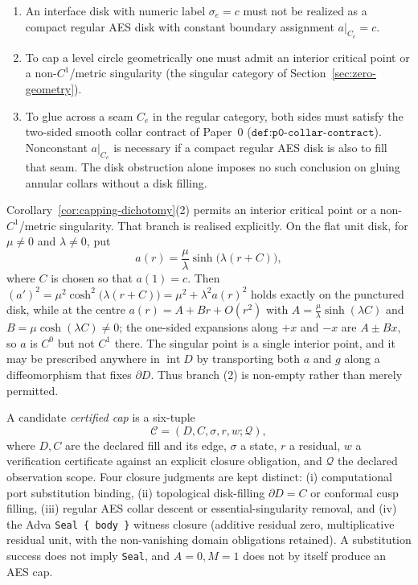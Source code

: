 \begin{corollary}
\label{cor:capping-dichotomy}
\begin{enumerate}
  \item An interface disk with numeric label $\sigma_e=c$ must not be realized
  as a compact regular AES disk with constant boundary assignment
  $a|_{C_e}=c$.
  \item To cap a level circle geometrically one must admit an interior critical
  point or a non-$C^1$/metric singularity (the singular category of
  Section~\ref{sec:zero-geometry}).
  \item To glue across a seam $C_e$ in the regular category, both sides must
  satisfy the two-sided smooth collar contract of Paper~0
  ($\texttt{def:p0-collar-contract}$).  Nonconstant $a|_{C_e}$ is necessary
  if a compact regular AES disk is also to fill that seam.  The disk
  obstruction alone imposes no such conclusion on gluing annular collars
  without a disk filling.
\end{enumerate}
\end{corollary}

\begin{remark}
\label{rem:capping-singular-branch-nonempty}
Corollary~\ref{cor:capping-dichotomy}(2) permits an interior critical point or a
non-$C^1$/metric singularity.  That branch is realised explicitly.  On the flat
unit disk, for $\mu\ne0$ and $\lambda\ne0$, put
\[
  a(r)=\frac{\mu}{\lambda}\sinh\bigl(\lambda(r+C)\bigr),
\]
where $C$ is chosen so that $a(1)=c$.  Then
$(a')^2=\mu^2\cosh^2\bigl(\lambda(r+C)\bigr)=\mu^2+\lambda^2a(r)^2$ holds exactly
on the punctured disk, while at the centre $a(r)=A+Br+O(r^2)$ with
$A=\frac{\mu}{\lambda}\sinh(\lambda C)$ and $B=\mu\cosh(\lambda C)\ne0$; the
one-sided expansions along $+x$ and $-x$ are $A\pm Bx$, so $a$ is $C^0$ but not
$C^1$ there.  The singular point is a single interior point, and it may be
prescribed anywhere in $\operatorname{int}D$ by transporting both $a$ and $g$
along a diffeomorphism that fixes $\partial D$.  Thus branch (2) is non-empty
rather than merely permitted.
\end{remark}

\begin{definition}
\label{def:certified-cap-tuple}
A candidate \emph{certified cap} is a six-tuple
\[
  \mathcal C=(D,C,\sigma,r,w;\mathcal Q),
\]
where $D,C$ are the declared fill and its edge, $\sigma$ a state, $r$ a
residual, $w$ a verification certificate against an explicit closure obligation,
and $\mathcal Q$ the declared observation scope.  Four closure judgments are kept
distinct: (i) computational port substitution binding, (ii) topological
disk-filling $\partial D=C$ or conformal cusp filling, (iii) regular AES collar
descent or essential-singularity removal, and (iv) the Adva
\texttt{Seal \{ body \}} witness closure (additive residual zero, multiplicative
residual unit, with the non-vanishing domain obligations retained).  A
substitution success does not imply \texttt{Seal}, and $A=0,M=1$ does not by
itself produce an AES cap.
\end{definition}
